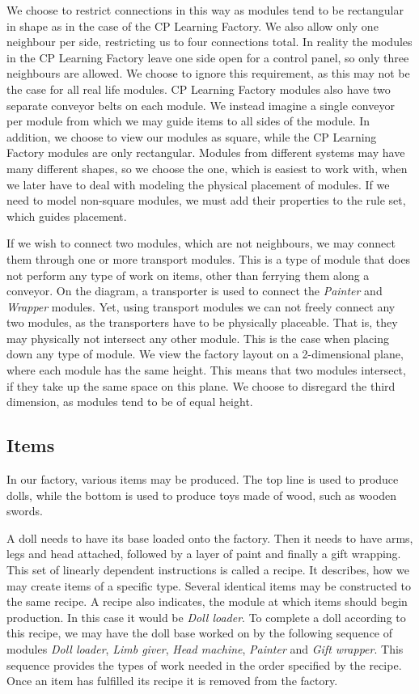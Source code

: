 We choose to restrict connections in this way as modules tend to be rectangular in shape as in the case of the CP Learning Factory. We also allow only one neighbour per side, restricting us to four connections total. In reality the modules in the CP Learning Factory leave one side open for a control panel, so only three neighbours are allowed. We choose to ignore this requirement, as this may not be the case for all real life modules. CP Learning Factory modules also have two separate conveyor belts on each module. We instead imagine a single conveyor per module from which we may guide items to all sides of the module. In addition, we choose to view our modules as square, while the CP Learning Factory modules are only rectangular. Modules from different systems may have many different shapes, so we choose the one, which is easiest to work with, when we later have to deal with modeling the physical placement of modules. If we need to model non-square modules, we must add their properties to the rule set, which guides placement. 

If we wish to connect two modules, which are not neighbours, we may connect them through one or more transport modules. This is a type of module that does not perform any type of work on items, other than ferrying them along a conveyor. On the diagram, a transporter is used to connect the \textit{Painter} and \textit{Wrapper} modules. Yet, using transport modules we can not freely connect any two modules, as the transporters have to be physically placeable. That is, they may physically not intersect any other module. This is the case when placing down any type of module. We view the factory layout on a 2-dimensional plane, where each module has the same height. This means that two modules intersect, if they take up the same space on this plane. We choose to disregard the third dimension, as modules tend to be of equal height.  

\subsection{Items}
In our factory, various items may be produced. The top line is used to produce dolls, while the bottom is used to produce toys made of wood, such as wooden swords. 

A doll needs to have its base loaded onto the factory. Then it needs to have arms, legs and head attached, followed by a layer of paint and finally a gift wrapping. This set of linearly dependent instructions is called a recipe. It describes, how we may create items of a specific type. Several identical items may be constructed to the same recipe. A recipe also indicates, the module at which items should begin production. In this case it would be \textit{Doll loader}. To complete a doll according to this recipe, we may have the doll base worked on by the following sequence of modules \textit{Doll loader}, \textit{Limb giver}, \textit{Head machine}, \textit{Painter} and \textit{Gift wrapper}. This sequence provides the types of work needed in the order specified by the recipe. Once an item has fulfilled its recipe it is removed from the factory. 

